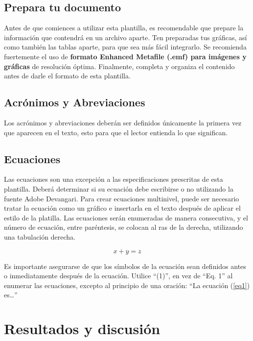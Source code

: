     
    \subsection{Prepara tu documento}
    
    Antes de que comiences a utilizar esta plantilla, es recomendable que prepare la información que contendrá en un archivo aparte. 
    Ten preparadas tus gráficas, así como también las tablas aparte, para que sea más fácil integrarlo. 
    Se recomienda fuertemente el uso de \textbf{formato Enhanced Metafile (.emf) para imágenes y gráficas} de resolución óptima. 
    Finalmente, completa y organiza el contenido antes de darle el formato de esta plantilla. 
    
    \subsection{Acrónimos y Abreviaciones}
    
    Los acrónimos y abreviaciones deberán ser definidos únicamente la primera vez que aparecen en el texto, esto para que el lector entienda lo que significan.
    
    \subsection{Ecuaciones}
    
    Las ecuaciones son una excepción a las especificaciones prescritas de esta plantilla. 
    Deberá determinar si su ecuación debe escribirse o no utilizando la fuente Adobe Devangari. 
    Para crear ecuaciones multinivel, puede ser necesario tratar la ecuación como un gráfico e insertarla en el texto después de aplicar el estilo de la platilla.
    Las ecuaciones serán enumeradas de manera consecutiva, y el número de ecuación, entre paréntesis, se colocan al ras de la derecha, utilizando una tabulación derecha. 
    
    \begin{equation}
        \label{eq1}
        x + y = z 
    \end{equation}
    
    Es importante asegurarse de que los símbolos de la ecuación sean definidos antes o inmediatamente después de la ecuación. Utilice “(1)”, en vez de “Eq. 1” al enumerar las ecuaciones, excepto al principio de una oración: “La ecuación (\ref{eq1}) es…”
    
    \section{Resultados y discusión}
    
